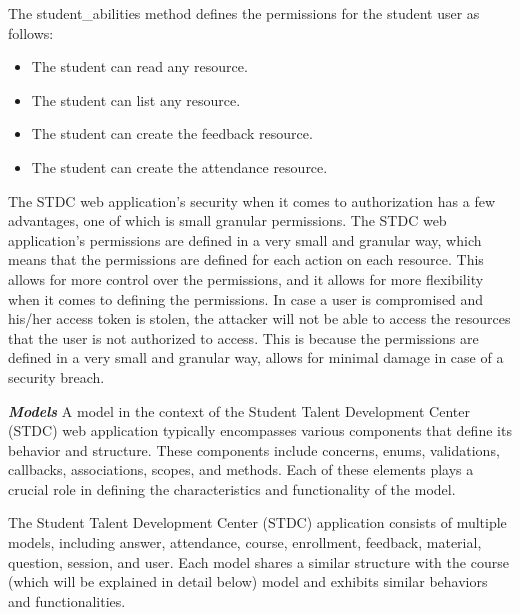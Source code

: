 \begin{justify}
            \vspace{0.25cm}
            \newendline The student\_abilities method defines the permissions for the student user as follows:
            \begin{itemize}
                \item The student can read any resource.
                \item The student can list any resource.
                \item The student can create the feedback resource.
                \item The student can create the attendance resource.\\
            \end{itemize}

    \vspace{0.25cm}
    \newendline The STDC web application's security when it comes to authorization has a few advantages, one of which is small granular permissions. The STDC web application's permissions are defined in a very small and granular way, which means that the permissions are defined for each action on each resource. This allows for more control over the permissions, and it allows for more flexibility when it comes to defining the permissions. In case a user is compromised and his/her access token is stolen, the attacker will not be able to access the resources that the user is not authorized to access. This is because the permissions are defined in a very small and granular way, allows for minimal damage in case of a security breach.
    
    \clearpage


    \vspace{0.25cm}
    \newendline \textbf{\textit{Models}}\newendline
        A model in the context of the Student Talent Development Center (STDC)  web application typically encompasses various components that define its behavior and structure. These components include concerns, enums, validations, callbacks, associations, scopes, and methods. Each of these elements plays a crucial role in defining the characteristics and functionality of the model.
        
        \vspace{0.25cm}
        \newendline The Student Talent Development Center (STDC) application consists of multiple models, including answer, attendance, course, enrollment, feedback, material, question, session, and user. Each model shares a similar structure with the course (which will be explained in detail below) model and exhibits similar behaviors and functionalities.
        

\end{justify}
